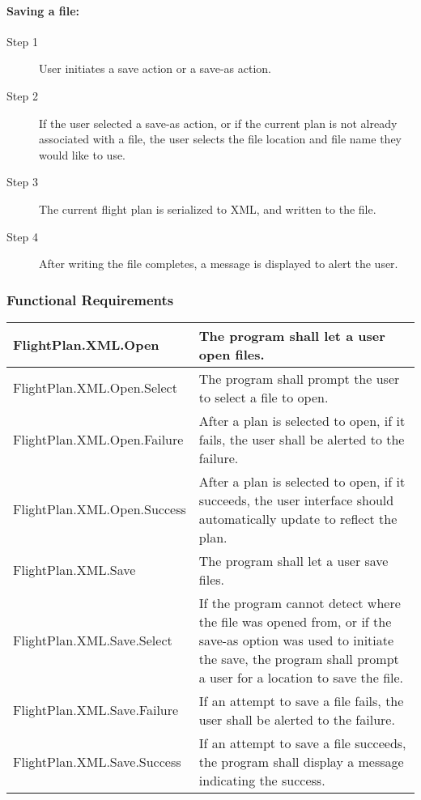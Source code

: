\documentclass[12pt, letterpaper]{article}
\begin{document}
\paragraph{Saving a file:}
\begin{description}
    \item[Step 1] User initiates a save action or a save-as action.
    \item[Step 2] If the user selected a save-as action, or if the current plan is not already associated with a file,
        the user selects the file location and file name they would like to use.
    \item[Step 3] The current flight plan is serialized to XML, and written to the file.
    \item[Step 4] After writing the file completes, a message is displayed to alert the user.
\end{description}

\subsubsection{Functional Requirements}
\begin{tabularx}{\textwidth}{|l|X|} \hline
FlightPlan.XML.Open & The program shall let a user open files. \\ \hline
FlightPlan.XML.Open.Select & The program shall prompt the user to select a file to open. \\ \hline
FlightPlan.XML.Open.Failure & After a plan is selected to open, if it fails, the user shall be alerted to the failure. \\ \hline
FlightPlan.XML.Open.Success & After a plan is selected to open, if it succeeds, the user interface should automatically update to reflect the plan. \\ \hline
FlightPlan.XML.Save & The program shall let a user save files. \\ \hline
FlightPlan.XML.Save.Select & If the program cannot detect where the file was opened from,
    or if the save-as option was used to initiate the save, the program shall prompt a user for a location to save the file. \\ \hline
FlightPlan.XML.Save.Failure & If an attempt to save a file fails, the user shall be alerted to the failure. \\ \hline
FlightPlan.XML.Save.Success & If an attempt to save a file succeeds, the program shall display a message indicating the success. \\ \hline
\end{tabularx}
\end{document}
